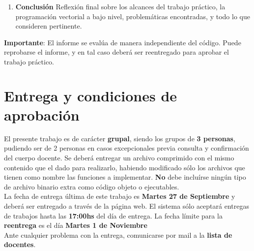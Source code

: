 \documentclass[a4paper, 12pt]{article}
\begin{document}
\begin{enumerate}
    \item
        \textbf{Conclusión}
        Reflexión final sobre los alcances del trabajo práctico,
        la programación vectorial a bajo nivel,
        problemáticas encontradas, y todo lo que consideren pertinente.
\end{enumerate}


\vspace*{0.3cm}
\textbf{Importante}: El informe se evalúa de manera independiente del
código.
Puede reprobarse el informe, y en tal caso deberá ser reentregado para
aprobar el trabajo práctico.



\section{Entrega y condiciones de aprobación}

El presente trabajo es de carácter \textbf{grupal}, siendo los grupos de
\textbf{3 personas}, pudiendo ser de 2 personas en casos excepcionales previa
consulta y confirmación del cuerpo docente. Se deberá entregar un archivo
comprimido con el mismo contenido que el dado para realizarlo, habiendo
modificado sólo los archivos que tienen como nombre las funciones a
implementar. \textbf{No} debe incluírse ningún tipo de archivo binario extra
como código objeto o ejecutables.\\


La fecha de entrega última de este trabajo es \textbf{Martes 27 de Septiembre} y deberá
ser entregado a través de la página web. El sistema s\'olo aceptará entregas
de trabajos hasta las \textbf{17:00hs} del día de entrega. La fecha límite para la \textbf{reentrega} es el día \textbf{Martes 1 de Noviembre}\\

Ante cualquier problema con la entrega, comunicarse por
mail a la \textbf{lista de docentes}.\\
\end{document}
